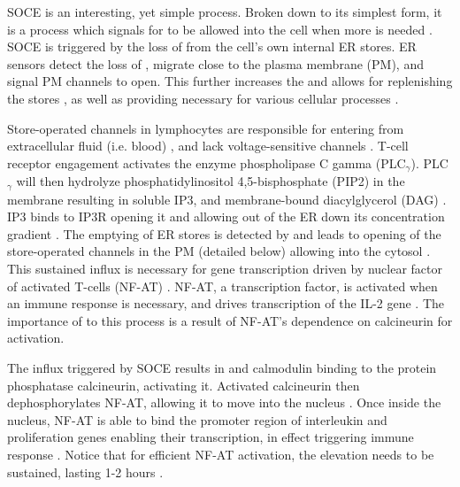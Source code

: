 SOCE is an interesting, yet simple process. Broken down to its simplest form, it is a process which signals for \Ca{} to be allowed into the cell when more is needed \citep{Putney:1986p283,Berridge2000,Lewis2001}. SOCE is triggered by the loss of \Ca{} from the cell's own internal ER \Ca{} stores. ER \Ca{} sensors detect the loss of \Ca{}, migrate close to the plasma membrane (PM), and signal PM \Ca{} channels to open. This further increases the \cai{} and allows for replenishing the stores \citep{Taylor2006}, as well as providing \Ca{} necessary for various cellular processes \citep{Berridge2003,Berridge2000,Gwack2007,Smyth2010}. %

Store-operated \Ca{} channels in lymphocytes are responsible for \Ca{} entering from extracellular fluid (i.e. blood) \citep{Lewis2001,Berridge2000, Gwack2007}, and lack voltage-sensitive \Ca{} channels \citep{Lioudyno2008}. T-cell receptor engagement activates the enzyme phospholipase C gamma (PLC$_\gamma$). PLC$_\gamma$ will then  hydrolyze phosphatidylinositol 4,5-bisphosphate (PIP2) in the membrane resulting in soluble IP3, and membrane-bound diacylglycerol (DAG) \citep{Berridge2000,Lewis2001}. IP3 binds to IP3R opening it and allowing \Ca{} out of the ER down its concentration gradient \citep{Smyth2010,Taylor2006,Lewis2001}. The emptying of ER \Ca{} stores is detected by \stim{} and leads to opening of the store-operated \Ca{} channels in the PM (detailed below) allowing \Ca{} into the cytosol \citep{Smyth2010,Taylor2006}. 
This sustained \Ca{} influx is necessary for gene transcription driven by nuclear factor of activated T-cells (NF-AT)  \citep{Timmerman:1996p528,Berridge2000,Lewis2001, Gwack2007}. NF-AT, a transcription factor, is activated when an immune response is necessary, and drives transcription of the IL-2 gene \citep{Timmerman:1996p528,Lewis2001,Gwack2007}. 
The importance of \Ca{} to this process is a result of NF-AT's dependence on calcineurin for activation. 

The \Ca{} influx triggered by SOCE results in \Ca{} and calmodulin binding to the protein phosphatase calcineurin, activating it. Activated calcineurin then dephosphorylates NF-AT, allowing it to move into the nucleus \citep{Timmerman:1996p528, Baksh2000}. Once inside the nucleus, NF-AT is able to bind the promoter region of interleukin and proliferation genes enabling their transcription, in effect triggering immune response \citep{Timmerman:1996p528,Berridge2000,Gwack2007}. 
Notice that for efficient NF-AT activation, the \Ca{} elevation needs to be sustained, lasting 1-2 hours \citep{Timmerman:1996p528,Berridge2000,Lewis2001}. 

